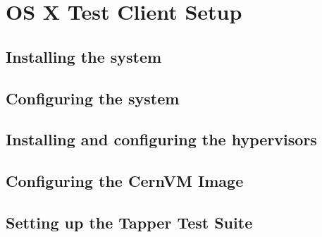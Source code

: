\section{OS X Test Client Setup}
\subsection{Installing the system}
\subsection{Configuring the system}
\subsection{Installing and configuring the hypervisors}
\subsection{Configuring the CernVM Image}
\subsection{Setting up the Tapper Test Suite}